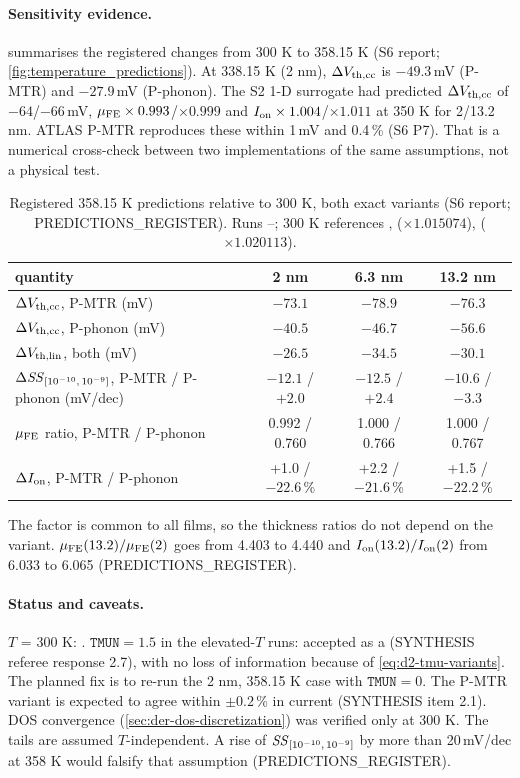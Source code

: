 \paragraph{Sensitivity evidence.}
 summarises the registered changes from 300 K to 358.15 K (S6 report; \cref{fig:temperature_predictions}). At 338.15 K (2 nm), $\Delta V_{\mathrm{th,cc}}$ is $-49.3$\,mV (P-MTR) and $-27.9$\,mV (P-phonon). The S2 1-D surrogate had predicted $\Delta V_{\mathrm{th,cc}}$ of $-64$/$-66$\,mV, $\mu_{\mathrm{FE}}\times0.993$/$\times0.999$ and $I_{\mathrm{on}}\times1.004$/$\times1.011$ at 350 K for 2/13.2 nm. ATLAS P-MTR reproduces these within 1\,mV and 0.4\,\% (S6 P7). That is a numerical cross-check between two implementations of the same assumptions, not a physical test.
\begin{table}[htbp]
\centering
\small
\caption{Registered 358.15 K predictions relative to 300 K, both exact variants (S6 report; PREDICTIONS\_REGISTER). Runs --; 300 K references ,  ($\times1.015074$),  ($\times1.020113$).}
\label{tab:d2-temperature}
\begin{tabular}{@{}lccc@{}}
\toprule
quantity & 2 nm & 6.3 nm & 13.2 nm \\
\midrule
$\Delta V_{\mathrm{th,cc}}$, P-MTR (mV) & $-73.1$ & $-78.9$ & $-76.3$ \\
$\Delta V_{\mathrm{th,cc}}$, P-phonon (mV) & $-40.5$ & $-46.7$ & $-56.6$ \\
$\Delta V_{\mathrm{th,lin}}$, both (mV) & $-26.5$ & $-34.5$ & $-30.1$ \\
$\Delta\mathit{SS}_{[10^{-10},\,10^{-9}]}$, P-MTR / P-phonon (mV/dec) & $-12.1$ / $+2.0$ & $-12.5$ / $+2.4$ & $-10.6$ / $-3.3$ \\
$\mu_{\mathrm{FE}}$ ratio, P-MTR / P-phonon & 0.992 / 0.760 & 1.000 / 0.766 & 1.000 / 0.767 \\
$\Delta I_{\mathrm{on}}$, P-MTR / P-phonon & +1.0 / $-22.6$\,\% & +2.2 / $-21.6$\,\% & +1.5 / $-22.2$\,\% \\
\bottomrule
\end{tabular}
\end{table}
The factor is common to all films, so the thickness ratios do not depend on the variant. $\mu_{\mathrm{FE}}(13.2)/\mu_{\mathrm{FE}}(2)$ goes from 4.403 to 4.440 and $I_{\mathrm{on}}(13.2)/I_{\mathrm{on}}(2)$ from 6.033 to 6.065 (PREDICTIONS\_REGISTER).

\paragraph{Status and caveats.}
$T$ = 300 K: . $\texttt{TMUN}=1.5$ in the elevated-$T$ runs: accepted as a  (SYNTHESIS referee response 2.7), with no loss of information because of \cref{eq:d2-tmu-variants}. The planned fix is to re-run the 2 nm, 358.15 K case with $\texttt{TMUN}=0$. The P-MTR variant is expected to agree within $\pm0.2$\,\% in current (SYNTHESIS item 2.1). DOS convergence (\cref{sec:der-dos-discretization}) was verified only at 300 K. The tails are assumed $T$-independent. A rise of $\mathit{SS}_{[10^{-10},\,10^{-9}]}$ by more than 20\,mV/dec at 358 K would falsify that assumption (PREDICTIONS\_REGISTER).

